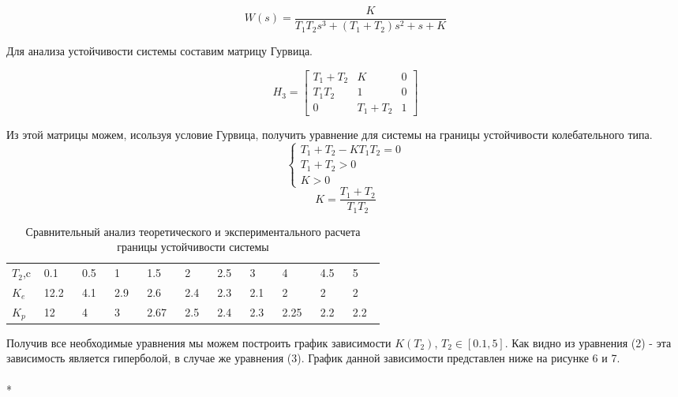 \documentclass[a4paper, 12pt]{article}
\begin{document}
\begin{equation}
W(s) = \frac{K}{T_1 T_2 s^3 + (T_1 + T_2)s^2 + s + K}
\end{equation}
\par Для анализа устойчивости системы составим матрицу Гурвица.

\begin{equation}
H_3 = \begin{bmatrix}
T_1 + T_2 &  K & 0 \\
T_1 T_2 & 1 & 0 \\
0 & T_1 + T_2 & 1
\end{bmatrix}
\end{equation}
\par Из этой матрицы можем, исользуя условие Гурвица, получить уравнение для системы на границы устойчивости колебательного типа.
\begin{equation}
\begin{cases}
T_1 + T_2 - K T_1 T_2 = 0 \\
T_1 + T_2 > 0 \\
K > 0
\end{cases}
\end{equation}
\begin{equation}
K =\frac{T_1 + T_2}{T_1T_2}
\end{equation}

\begin{table}[h]
		\caption{ Сравнительный анализ теоретического и экспериментального расчета границы устойчивости системы}
		
        \begin{center}
        
        
		\begin{tabular}{|p{0.05\linewidth}|p{0.05\linewidth}|p{0.05\linewidth}|p{0.05\linewidth}|p{0.05\linewidth}|p{0.05\linewidth}|p{0.05\linewidth}|p{0.05\linewidth}|p{0.05\linewidth}|p{0.05\linewidth}|p{0.05\linewidth}|}
			\hline
			\rule{0cm}{0.5cm}
			$T_2$,c & 0.1 & 0.5 & 1 & 1.5 & 2 & 2.5 & 3 & 4 & 4.5 & 5\tabularnewline	
			\cline{1-11}
			$K_e$ & 12.2 & 4.1 & 2.9 & 2.6 & 2.4 & 2.3 & 2.1 & 2 & 2 & 2\\
			\cline{1-11}
		    $K_p$ & 12 & 4 & 3 & 2.67 & 2.5 & 2.4 & 2.3 & 2.25 & 2.2 & 2.2\\
				\hline
			
		\end{tabular}
\end{center}
\end{table}

	Получив все необходимые уравнения мы можем построить график зависимости $K(T_2)$, $T_2 \in [0.1, 5]$. Как видно из уравнения (2) - эта зависимость является гиперболой, в случае же уравнения (3). График данной зависимости представлен ниже на рисунке 6 и 7. \\
	\hfill\\*
\end{document}
